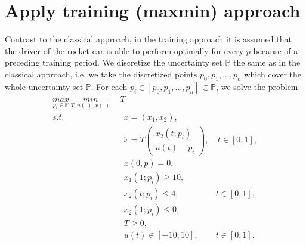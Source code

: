 \documentclass  [
  paper    = a4,
  BCOR     = 10mm,
  twoside,
  fontsize = 12pt,
  fleqn,
  toc      = bibnumbered,
  toc      = listofnumbered,
  numbers  = noendperiod,
  headings = normal,
  listof   = leveldown,
  version  = 3.03
]                                       {scrreprt}
\newcommand{\<}{\langle}
\renewcommand{\>}{\rangle}
\begin{document}



\section{Apply training (maxmin) approach}
Contrast to the classical approach, in the training approach it is assumed that the driver of the rocket car is able to perform optimally for every $p$ because of a preceding training period. We discretize the uncertainty set $\mathbb{P}$ the same as in the classical approach, i.e. we take the discretized points $p_0, p_1, ..., p_n$ which cover the whole uncertainty set $\mathbb{P}$.  For each $ p_i  \in [p_0, p_1, ..., p_n] \subset \mathbb{P}$, we solve the problem 
\begin{subequations}
	\begin{align}
		 \underset{p_i \in \mathbb{P}}{max}  \ \underset{T, u(\cdot), x(\cdot)}{min}  \ \   &   T  \\ 
		s.t.  & \ \ x = (x_1, x_2),   \label{ta_rc_x} \\ 
		& \ \  \dot{x} = T  \begin{pmatrix}  x_2(t;p_i) \\ u(t)-p_i   \end{pmatrix}, & \ t \in [0,1],  \label{ta_rc_partial} \\
		& \ \ x(0,p) = 0, \label{ta_rc_t0}\\
		& \ \ x_1(1;p_i) \geq 10, \label{ta_rc_x1_t1} \\
		& \ \ x_2(t;p_i) \leq 4, & t \in [0,1], \label{ta_rc_x2_tc} \\
		& \ \ x_2(1;p_i) \leq 0, \label{ta_rc_x2_t1}  \\
		& \ \ T \geq 0, \\
		& \ \ u(t) \in [-10, 10], & t \in [0,1]. 
	\end{align}
	\label{TA_rc}
\end{subequations}
\end{document}
